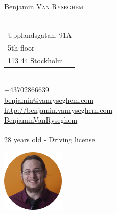 \documentclass{curve}
\title{}
\begin{document}

\begin{minipage}{7cm}
\large
Benjamin \textsc{Van Ryseghem}\\
\normalsize
\\
{ \begin{tabular}{@{}l}
Upplandsgatan, 91A\\
5th floor\\
113 44 Stockholm
\end{tabular}}\\

{ +43702866639}\\
\href{mailto:benjamin@vanryseghem.com}{ benjamin@vanryseghem.com}\\
\href{http://benjamin.vanryseghem.com}{ \url{http://benjamin.vanryseghem.com}}\\
\href{https://github.com/BenjaminVanRyseghem}{ BenjaminVanRyseghem}\\
\\28 years old - Driving license
\end{minipage}
\hfill
\begin{minipage}{7cm}
  \begin{flushright}
  \includegraphics[height=3cm]{Moi}
  \end{flushright}
\end{minipage}
\maketitle
\vspace{-1cm}
\end{document}
